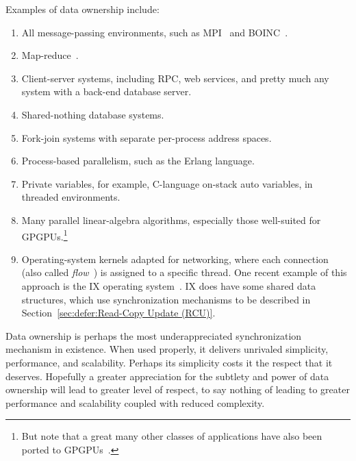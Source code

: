 Examples of data ownership include:

\begin{enumerate}
\item	All message-passing environments, such as MPI~\cite{MPIForum2008}
	and BOINC~\cite{BOINC2008}.
\item	Map-reduce~\cite{MapReduce2008MIT}.
\item	Client-server systems, including RPC, web services, and
	pretty much any system with a back-end database server.
\item	Shared-nothing database systems.
\item	Fork-join systems with separate per-process address spaces.
\item	Process-based parallelism, such as the Erlang language.
\item	Private variables, for example, C-language on-stack auto variables,
	in threaded environments.
\item	Many parallel linear-algebra algorithms, especially those
	well-suited for GPGPUs.\footnote{
		But note that a great many other classes of applications
		have also been ported to
		GPGPUs~\cite{NormMatloff2013ParProcBook,AMD2020ROCm,NVidia2017GPGPU,NVidia2017GPGPU-university}.}
\item	Operating-system kernels adapted for networking, where each connection
	(also called \emph{flow}~\cite{Shenker89,ZhangPhD,McKenney90})
	is assigned to a specific thread.
	One recent example of this approach is the IX operating
	system~\cite{Belay:2016:IOS:3014162.2997641}.
	IX does have some shared data structures, which use synchronization
	mechanisms to be described in
	Section~\ref{sec:defer:Read-Copy Update (RCU)}.
\end{enumerate}

Data ownership is perhaps the most underappreciated synchronization
mechanism in existence.
When used properly, it delivers unrivaled simplicity, performance,
and scalability.
Perhaps its simplicity costs it the respect that it deserves.
Hopefully a greater appreciation for the subtlety and power of data ownership
will lead to greater level of respect, to say nothing of leading to
greater performance and scalability coupled with reduced complexity.

